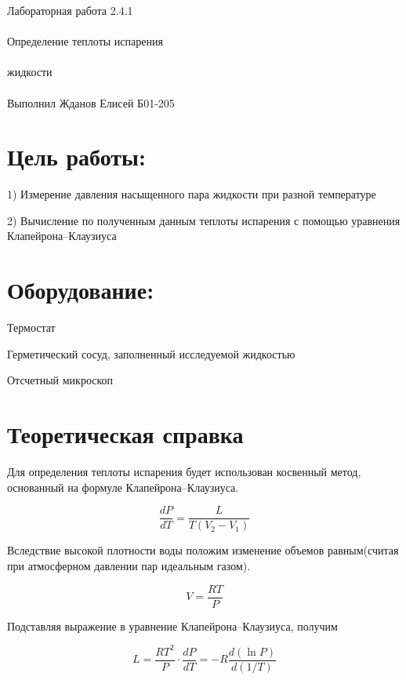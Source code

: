 \documentclass{astroedu-lab}
\begin{document}
\pagestyle{plain}

\begin{problem}{\huge Лабораторная работа 2.4.1\\\\Определение теплоты испарения\\\\жидкости\\\\Выполнил Жданов Елисей Б01-205}

\section{Цель работы:}

1) Измерение давления насыщенного пара жидкости при разной температуре

2) Вычисление по полученным данным теплоты испарения с помощью уравнения Клапейрона–Клаузиуса

\section{Оборудование:}

Термостат

Герметический сосуд, заполненный исследуемой жидкостью

Отсчетный микроскоп

\section{Теоретическая справка}

Для определения теплоты испарения будет использован косвенный метод, основанный на формуле Клапейрона–Клаузиуса.

\begin{equation}
	\frac{d P}{d T}=\frac{L}{T\left(V_2-V_1\right)}
\end{equation}

Вследствие высокой плотности воды положим изменение объемов равным(считая при атмосферном давлении пар идеальным газом).

\begin{equation}
	V=\frac{R T}{P}
\end{equation}

Подставляя выражение в уравнение Клапейрона–Клаузиуса, получим

\begin{equation}
	\boxed{L=\frac{R T^2}{P} \cdot \frac{d P}{d T}=-R \frac{d(\ln P)}{d(1 / T)}}
\end{equation}


\end{problem}
\end{document}
